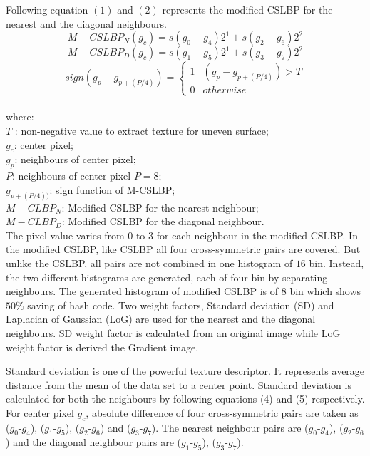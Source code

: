 \documentclass[12pt,a4paper]{jihmsp}
\begin{document}
{{Following equation $(1)$ and $(2)$ represents the modified CSLBP for the nearest and the diagonal neighbours.
\begin{equation}
M-CSLBP_{N}(g_c)=s(g_0-g_4)2^1+s(g_2-g_6)2^2
\end{equation}
\begin{equation}
M-CSLBP_{D}(g_c)=s(g_1-g_5)2^1+s(g_3-g_7)2^2
\end{equation}
\begin{equation}
sign(g_p-g_{p+(P/4)})=\begin{cases}1 & (g_p-g_{p+(P/4)})>T\\0 & otherwise\end{cases}
\end{equation}
\\
where:\\
$T$ : non-negative value to extract texture for uneven surface;\\
$g_c$: center pixel;\\
$g_p$: neighbours of center pixel;\\
$P$: neighbours of center pixel $P=8$;\\
$g_{p+(P/4))}$: sign function of M-CSLBP;\\
$M-CLBP_N$: Modified CSLBP for the nearest neighbour;\\
$M-CLBP_D$: Modified CSLBP for the diagonal neighbour.\\


The pixel value varies from $0$ to $3$ for each neighbour in the modified CSLBP. In the modified CSLBP, like CSLBP all four cross-symmetric pairs are covered. But unlike the CSLBP,  all pairs are not combined in one histogram of $16$ bin. Instead, the two different histograms are generated, each of four bin by separating neighbours. The generated histogram of modified CSLBP is of $8$ bin which shows $50\%$ saving of hash code. Two weight factors, Standard deviation (SD) and Laplacian of Gaussian (LoG) are used for the nearest and the diagonal neighbours. SD weight factor is calculated from an original image while LoG weight factor is derived the Gradient image. 
\par
Standard deviation is one of the powerful texture descriptor. It represents average distance from the mean of the data set to a center point. Standard deviation is calculated for both the neighbours by following equations (4) and (5) respectively. For center pixel $g_c$, absolute difference of four cross-symmetric pairs are taken as ($g_0$-$g_4$), ($g_1$-$g_5$), ($g_2$-$g_6$) and ($g_3$-$g_7$). The nearest neighbour pairs are ($g_0$-$g_4$), ($g_2$-$g_6$) and the diagonal neighbour pairs are ($g_1$-$g_5$), ($g_3$-$g_7$).

}}
\end{document}
